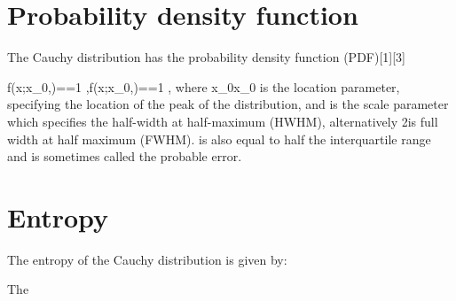 
\section*{Probability density function}
The Cauchy distribution has the probability density function (PDF)[1][3]

{\displaystyle f(x;x_{0},\gamma )={}={1 \over \pi \gamma },}f(x;x_{0},\gamma )={}={1 \over \pi \gamma },
where {\displaystyle x_{0}}x_{0} is the location parameter, specifying the location of the peak of the distribution, and {\displaystyle \gamma }\gamma  is the scale parameter which specifies the half-width at half-maximum (HWHM), alternatively {\gamma }2\gamma  is full width at half maximum (FWHM). {\displaystyle \gamma }\gamma  is also equal to half the interquartile range and is sometimes called the probable error.

\section*{Entropy}
The entropy of the Cauchy distribution is given by:

{}{}
The